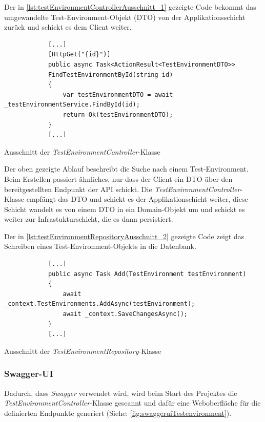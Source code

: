 \documentclass[a4paper, fontsize=11pt, parskip=half, twoside]{scrreprt}
\begin{document}
	Der in \autoref{lst:testEnvironmentControllerAusschnitt_1} gezeigte Code bekommt das umgewandelte Test-Environment-Objekt (\ac{DTO}) von der Applikationsschicht zurück und schickt es dem Client weiter.
	
	\begin{listing}[!htb]
		\begin{verbatim}
			[...]	
			[HttpGet("{id}")]
			public async Task<ActionResult<TestEnvironmentDTO>> 
			FindTestEnvironmentById(string id)
			{
				var testEnvironmentDTO = await _testEnvironmentService.FindById(id);
				return Ok(testEnvironmentDTO);
			}	
			[...]
		\end{verbatim}
		\caption{Ausschnitt der \emph{TestEnvironmentController}-Klasse}
		\label{lst:testEnvironmentControllerAusschnitt_1}
	\end{listing}

	Der oben gezeigte Ablauf beschreibt die Suche nach einem Test-Environment. 
	Beim Erstellen passiert ähnliches, nur dass der Client ein \ac{DTO} über den bereitgestellten Endpunkt der \ac{API} schickt.
	Die \emph{TestEnvironmentController}-Klasse empfängt das \ac{DTO} und schickt es der Applikationschicht weiter, diese Schicht wandelt es von einem \ac{DTO} in ein Domain-Objekt um und schickt es weiter zur Infrastukturschicht, die es dann persistiert.
	
	Der in \autoref{lst:testEnvironmentRepositoryAusschnitt_2} gezeigte Code zeigt das Schreiben eines Test-Environment-Objekts in die Datenbank.
	
	\begin{listing}[!htb]
		\begin{verbatim}
			[...]	
			public async Task Add(TestEnvironment testEnvironment)
			{
				await _context.TestEnvironments.AddAsync(testEnvironment);
				await _context.SaveChangesAsync();
			}
			[...]
		\end{verbatim}
		\caption{Ausschnitt der \emph{TestEnvironmentRepository}-Klasse}
		\label{lst:testEnvironmentRepositoryAusschnitt_2}
	\end{listing}
	
	\subsubsection{Swagger-UI}
	Dadurch, dass \emph{Swagger} verwendet wird, wird beim Start des Projektes die \emph{TestEnvironmentController}-Klasse gescannt und dafür eine Weboberfläche für die definierten Endpunkte generiert (Siehe: \autoref{fig:swaggeruiTestenvironment}).
	
\end{document}
